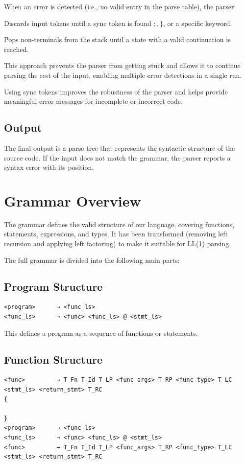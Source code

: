 \documentclass[12pt, a4paper]{report}
\begin{document}
When an error is detected (i.e., no valid entry in the parse table), the parser:

Discards input tokens until a sync token is found \( ;, \} \), or a specific keyword.

Pops non-terminals from the stack until a state with a valid continuation is reached.

This approach prevents the parser from getting stuck and allows it to continue parsing the rest of the input, enabling multiple error detections in a single run.

Using sync tokens improves the robustness of the parser and helps provide meaningful error messages for incomplete or incorrect code.


\subsection{Output}

The final output is a parse tree that represents the syntactic structure of the source code. If the input does not match the grammar, the parser reports a syntax error with its position.


\section{Grammar Overview}

The grammar defines the valid structure of our language, covering functions, statements, expressions, and types. It has been transformed (removing left recursion and applying left factoring) to make it suitable for LL(1) parsing.

The full grammar is divided into the following main parts:

\subsection{Program Structure}

\begin{lstlisting}
<program>      → <func_ls>
<func_ls>      → <func> <func_ls> @ <stmt_ls>
\end{lstlisting}
This defines a program as a sequence of functions or statements.


\subsection{Function Structure}
\begin{lstlisting}
<func>         → T_Fn T_Id T_LP <func_args> T_RP <func_type> T_LC <stmt_ls> <return_stmt> T_RC
{
	
}
<program>      → <func_ls>
<func_ls>      → <func> <func_ls> @ <stmt_ls>
<func>         → T_Fn T_Id T_LP <func_args> T_RP <func_type> T_LC <stmt_ls> <return_stmt> T_RC
\end{lstlisting}
\end{document}
